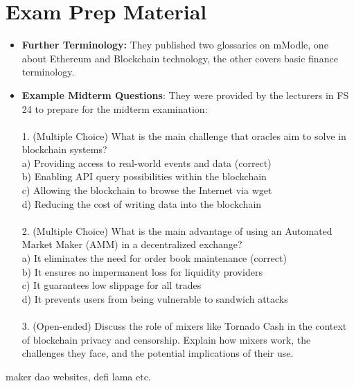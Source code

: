 \documentclass{article}
\begin{document}
\section{Exam Prep Material}
\begin{itemize}
    \item \textbf{Further Terminology: } They published two glossaries on mModle, one about Ethereum and Blockchain technology, the other covers basic finance terminology.
    \item \textbf{Example Midterm Questions}: They were provided by the lecturers in FS 24 to prepare for the midterm examination:\\\\
    1. (Multiple Choice) What is the main challenge that oracles aim to solve in blockchain systems?\\

   a) Providing access to real-world events and data (correct)\\

   b) Enabling API query possibilities within the blockchain\\

   c) Allowing the blockchain to browse the Internet via wget\\

   d) Reducing the cost of writing data into the blockchain\\\\
2. (Multiple Choice) What is the main advantage of using an Automated Market Maker (AMM) in a decentralized exchange?\\

   a) It eliminates the need for order book maintenance (correct)\\

   b) It ensures no impermanent loss for liquidity providers\\

   c) It guarantees low slippage for all trades\\

   d) It prevents users from being vulnerable to sandwich attacks\\\\



3. (Open-ended) Discuss the role of mixers like Tornado Cash in the context of blockchain privacy and censorship. Explain how mixers work, the challenges they face, and the potential implications of their use.\\
\end{itemize}

maker dao websites, defi lama etc.
\end{document}
